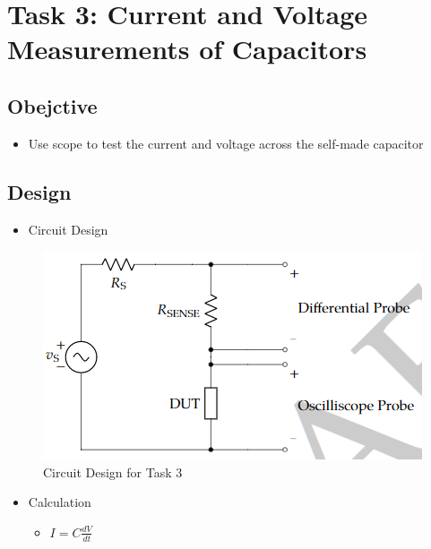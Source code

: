 \documentclass[journal, letterpaper]{IEEEtran}
\begin{document}
\section{\textbf{Task 3: Current and Voltage Measurements of Capacitors}}
	\subsection{Obejctive}
    	\begin{itemize}
    		\item Use scope to test the current and voltage across the self-made capacitor
    	\end{itemize}
	\subsection{Design}
    	\begin{itemize}
    		\item Circuit Design
    	\end{itemize}
        \begin{figure}[!hbt]
        	\begin{center}
        		\includegraphics[width=\columnwidth]{l7_2}
                \caption{Circuit Design for Task 3}
                \label{fig:l7_3}
        	\end{center}
        \end{figure}
        \begin{itemize}
        \item Calculation
        	\begin{itemize}
        	\item $I = C\frac{dV}{dt}$
        	\end{itemize}
        \end{itemize}
\end{document}
